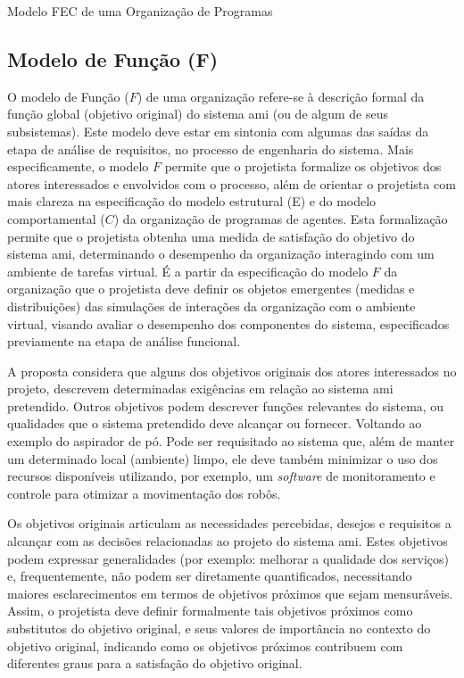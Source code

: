 \begin{section}{Modelo FEC de uma Organização de Programas}
    \subsection{Modelo de Função (F)}
    \label{modelo-fec-f}
    
    O modelo de Função ($F$) de uma organização refere-se à descrição formal da função global (objetivo original) do sistema \acrshort{ami} (ou de algum de seus subsistemas). Este modelo deve estar em sintonia com algumas das saídas da etapa de análise de requisitos, no processo de engenharia do sistema. Mais especificamente, o modelo $F$ permite que o projetista formalize os objetivos dos atores interessados e envolvidos com o processo, além de orientar o projetista com mais clareza na especificação do modelo estrutural (E) e do modelo comportamental ($C$) da organização de programas de agentes. Esta formalização permite que o projetista obtenha uma medida de satisfação do objetivo do sistema \acrshort{ami}, determinando o desempenho da organização interagindo com um ambiente de tarefas virtual. É a partir da especificação do modelo $F$ da organização que o projetista deve definir os objetos emergentes (medidas e distribuições) das simulações de interações da organização com o ambiente virtual, visando avaliar o desempenho dos componentes do sistema, especificados previamente na etapa de análise funcional.

    A proposta considera que alguns dos objetivos originais dos atores interessados no projeto, descrevem determinadas exigências em relação ao sistema \acrshort{ami} pretendido. Outros objetivos podem descrever funções relevantes do sistema, ou qualidades que o sistema pretendido deve alcançar ou fornecer. Voltando ao exemplo do aspirador de pó. Pode ser requisitado ao sistema que, além de manter um determinado local  (ambiente) limpo, ele deve também minimizar o uso dos recursos disponíveis utilizando, por exemplo, um \textit{software} de monitoramento e controle para otimizar a movimentação dos robôs.
    
    Os objetivos originais articulam as necessidades percebidas, desejos e requisitos a alcançar com as decisões relacionadas ao projeto do sistema \acrshort{ami}. Estes objetivos podem expressar generalidades (por exemplo: melhorar a qualidade dos serviços) e, frequentemente, não podem ser diretamente quantificados, necessitando maiores esclarecimentos em termos de objetivos próximos que sejam mensuráveis. Assim, o projetista deve definir formalmente tais objetivos próximos como substitutos do objetivo original, e seus valores de importância no contexto do objetivo original, indicando como os objetivos próximos contribuem com diferentes graus para a satisfação do objetivo original.
    

\end{section}
